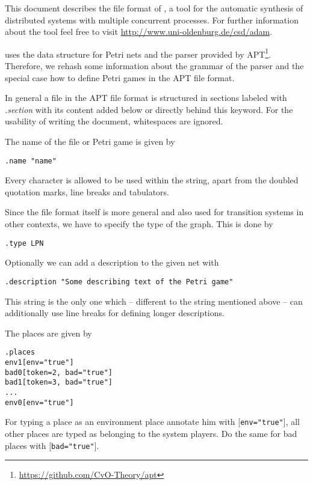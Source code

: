 This document describes the file format of \tool{}, a tool for the automatic synthesis of distributed systems with multiple concurrent processes. For further information about the tool feel free to visit \url{http://www.uni-oldenburg.de/csd/adam}.

\tool{} uses the data structure for Petri nets and the parser provided by APT\footnote{\url{https://github.com/CvO-Theory/apt}}. Therefore, we rehash some information about the grammar of the parser and the special case how to define Petri games in the APT file format.

In general a file in the APT file format is structured in sections labeled with \textit{.section} with its content added below or directly behind this keyword. For the usability of writing the document, whitespaces are ignored.

The name of the file or Petri game is given by 

\begin{lstlisting}[language=apt-format]
.name "name"
\end{lstlisting}

Every character is allowed to be used within the string, apart from the doubled quotation marks, line breaks and tabulators.

Since the file format itself is more general and also used for transition systems in other contexts, we have to specify the type of the graph. This is done by

\begin{lstlisting}[language=apt-format]
.type LPN
\end{lstlisting}

Optionally we can add a description to the given net with

\begin{lstlisting}[language=apt-format]
.description "Some describing text of the Petri game"
\end{lstlisting}

This string is the only one which -- different to the string mentioned above -- can additionally use line breaks for defining longer descriptions.

The places are given by

\begin{lstlisting}[language=apt-format]
.places
env1[env="true"]
bad0[token=2, bad="true"]
bad1[token=3, bad="true"]
...
env0[env="true"]
\end{lstlisting}

For typing a place as an environment place annotate him with [\texttt{env="true"}], all other places are typed as belonging to the system players. Do the same for bad places with [\texttt{bad="true"}].

